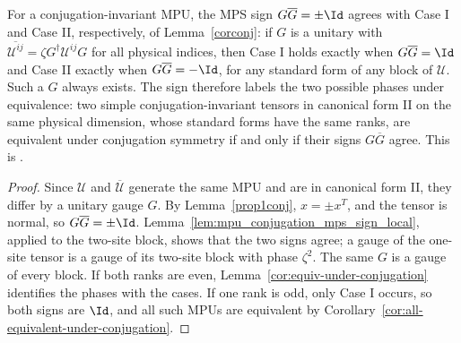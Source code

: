 \begin{lemma}
    \label{prop:mps-class-eq-mpu-class-for-conjugation}
    \leanok
    For a conjugation-invariant MPU, the MPS sign
    $G\overline G=\pm\Id$ agrees with Case I and Case II, respectively, of
    Lemma~\ref{corconj}: if $G$ is a unitary with
    $\overline{\mathcal U^{ij}}=\zeta G^\dagger\mathcal U^{ij}G$ for all
    physical indices, then Case I holds exactly when $G\overline G=\Id$ and
    Case II exactly when $G\overline G=-\Id$, for any standard form of any
    block of $\mathcal U$. Such a $G$ always exists. The sign therefore labels
    the two possible phases under equivalence: two simple conjugation-invariant tensors in canonical form II
    on the same physical dimension, whose standard forms have the same ranks,
    are equivalent under conjugation symmetry if and only if their signs
    $G\overline G$ agree. This is \cite[Proposition~VI.12]{Cirac2017MPU}.
\end{lemma}

\begin{proof}
    \leanok
    Since $\mathcal U$ and $\overline{\mathcal U}$ generate the same MPU and are
    in canonical form II, they differ by a unitary gauge $G$. By
    Lemma~\ref{prop1conj}, $x=\pm x^T$, and the tensor is normal, so
    $G\overline G=\pm\Id$. Lemma~\ref{lem:mpu_conjugation_mps_sign_local},
    applied to the two-site block, shows that the two signs agree; a gauge of
    the one-site tensor is a gauge of its two-site block with phase $\zeta^2$.
    The same $G$ is a gauge of every block. If both
    ranks are even, Lemma~\ref{cor:equiv-under-conjugation} identifies the
    phases with the cases. If one rank is odd, only Case I occurs, so both
    signs are $\Id$, and all such MPUs are equivalent by
    Corollary~\ref{cor:all-equivalent-under-conjugation}.
\end{proof}

